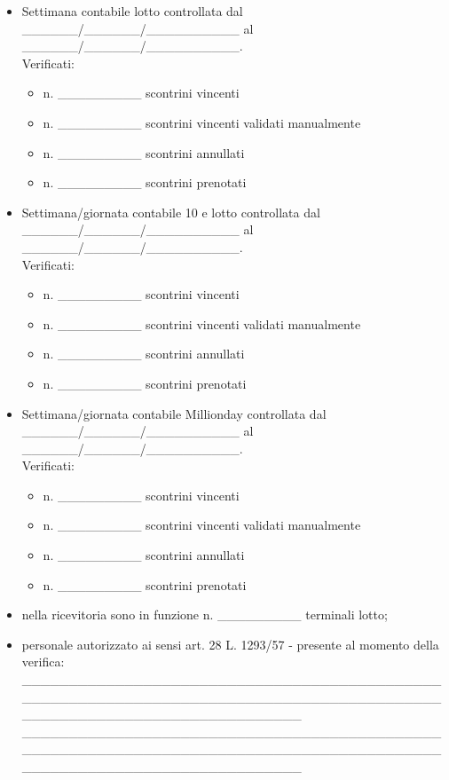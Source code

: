 \documentclass[12pt]{article}
\begin{document}
\begin{itemize}
    \item Settimana contabile lotto controllata dal \_\_\_\_\_\_/\_\_\_\_\_\_/\_\_\_\_\_\_\_\_\_\_ al \_\_\_\_\_\_/\_\_\_\_\_\_/\_\_\_\_\_\_\_\_\_\_.
    \\Verificati:
    \begin{itemize}
        \item n. \_\_\_\_\_\_\_\_\_ scontrini vincenti
        \item n. \_\_\_\_\_\_\_\_\_ scontrini vincenti validati manualmente
        \item n. \_\_\_\_\_\_\_\_\_ scontrini annullati
        \item n. \_\_\_\_\_\_\_\_\_ scontrini prenotati
    \end{itemize}
    \item Settimana/giornata contabile 10 e lotto controllata dal \_\_\_\_\_\_/\_\_\_\_\_\_/\_\_\_\_\_\_\_\_\_\_ al \_\_\_\_\_\_/\_\_\_\_\_\_/\_\_\_\_\_\_\_\_\_\_.
    \\Verificati:
    \begin{itemize}
        \item n. \_\_\_\_\_\_\_\_\_ scontrini vincenti
        \item n. \_\_\_\_\_\_\_\_\_ scontrini vincenti validati manualmente
        \item n. \_\_\_\_\_\_\_\_\_ scontrini annullati
        \item n. \_\_\_\_\_\_\_\_\_ scontrini prenotati
    \end{itemize}
    \item Settimana/giornata contabile Millionday controllata dal \_\_\_\_\_\_/\_\_\_\_\_\_/\_\_\_\_\_\_\_\_\_\_ al \_\_\_\_\_\_/\_\_\_\_\_\_/\_\_\_\_\_\_\_\_\_\_.
    \\Verificati:
    \begin{itemize}
        \item n. \_\_\_\_\_\_\_\_\_ scontrini vincenti
        \item n. \_\_\_\_\_\_\_\_\_ scontrini vincenti validati manualmente
        \item n. \_\_\_\_\_\_\_\_\_ scontrini annullati
        \item n. \_\_\_\_\_\_\_\_\_ scontrini prenotati
    \end{itemize}
    \item nella ricevitoria sono in funzione n. \_\_\_\_\_\_\_\_\_ terminali lotto;
    \item personale autorizzato ai sensi art. 28 L. 1293/57 - presente al momento della verifica: \\ \_\_\_\_\_\_\_\_\_\_\_\_\_\_\_\_\_\_\_\_\_\_\_\_\_\_\_\_\_\_\_\_\_\_\_\_\_\_\_\_\_\_\_\_\_\_\_\_\_\_\_\_\_\_\_\_\_\_\_\_\_\_\_\_\_\_\_\_\_\_\_\_\_\_\_\_\_\_\_\_\_\_\_\_\_\_\_\_\_\_\_\_\_\_\_\_\_\_\_\_\_\_\_\_\_\_\_\_\_\_\_\_\_\_\_\_\_\_\_\_ \\ \_\_\_\_\_\_\_\_\_\_\_\_\_\_\_\_\_\_\_\_\_\_\_\_\_\_\_\_\_\_\_\_\_\_\_\_\_\_\_\_\_\_\_\_\_\_\_\_\_\_\_\_\_\_\_\_\_\_\_\_\_\_\_\_\_\_\_\_\_\_\_\_\_\_\_\_\_\_\_\_\_\_\_\_\_\_\_\_\_\_\_\_\_\_\_\_\_\_\_\_\_\_\_\_\_\_\_\_\_\_\_\_\_\_\_\_\_\_\_\_
\end{itemize}
\end{document}

